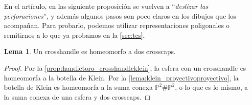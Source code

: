 \documentclass[10pt]{report}
\newcommand{\Proyectivo}{\mathbb{P}^2}
\theoremstyle{definition}
\newtheorem{lema}[defin]{Lema}
\begin{document}
En el artículo, en las siguiente proposición se vuelven a ``\textit{deslizar las perforaciones}'', y además algunos pasos son poco claros en los dibujos que los acompañan. Para probarlo, podemos utilizar representaciones poligonales o remitirnos a lo que ya probamos en la \autoref{sec:tcs}.

\begin{lema}\label{lema:1}
Un crosshandle es homeomorfo a dos crosscaps.
\end{lema}
\begin{proof}

Por la \autoref{prop:handletoro_crosshandleklein}, la esfera con un crosshandle es homeomorfa a la botella de Klein. Por la \autoref{lema:klein_proyectivoproyectivo}, la botella de Klein es homeomorfa a la suma conexa $\Proyectivo \# \Proyectivo$, o lo que es lo mismo, a la suma conexa de una esfera y dos crosscaps. 

\end{proof}
\end{document}
